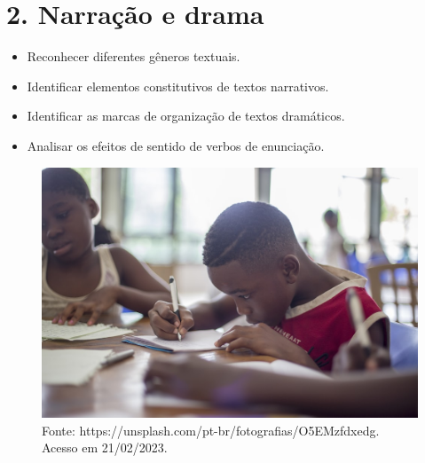 \chapter{2. Narração e drama}



\begin{itemize}
\item Reconhecer diferentes gêneros textuais.

\item Identificar elementos constitutivos de textos narrativos.

\item Identificar as marcas de organização de textos dramáticos.

\item Analisar os efeitos de sentido de verbos de enunciação.
\end{itemize}

\begin{figure}[htpb!]
\includegraphics[width=.5\textwidth]{./imgs/img4.jpg}
\caption{Fonte: https://unsplash.com/pt-br/fotografias/O5EMzfdxedg. Acesso em 21/02/2023.}
\end{figure}

